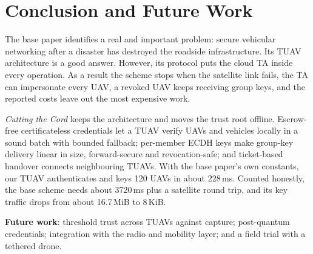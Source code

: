 \section{Conclusion and Future Work}\label{sec:conclusion}
The base paper identifies a real and important problem: secure vehicular networking after a disaster has destroyed the roadside infrastructure. Its TUAV
architecture is a good answer. However, its protocol puts the cloud TA inside every operation. As a result the scheme stops when the satellite link fails, the TA
can impersonate every UAV, a revoked UAV keeps receiving group keys, and the reported costs leave out the most expensive work.

\emph{Cutting the Cord} keeps the architecture and moves the trust root offline. Escrow-free certificateless credentials let a TUAV verify UAVs and vehicles
locally in a sound batch with bounded fallback; per-member ECDH keys make group-key delivery linear in size, forward-secure and revocation-safe; and ticket-based handover
connects neighbouring TUAVs. With the base paper's own constants, our TUAV authenticates and keys 120 UAVs in about 228\,ms. Counted honestly, the base scheme needs about 3720\,ms
plus a satellite round trip, and its key traffic drops from about 16.7\,MiB to 8\,KiB.

\textbf{Future work}: threshold trust across TUAVs against capture; post-quantum credentials; integration with the radio and mobility layer; and a field trial with a tethered drone.

